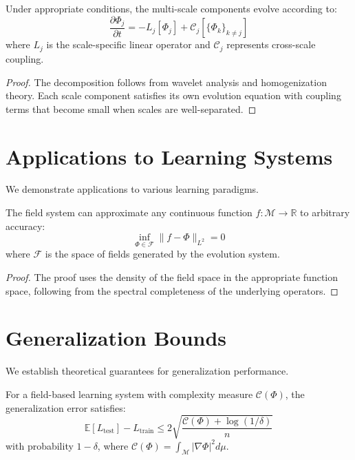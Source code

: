 \begin{theorem}
\label{thm:scale_separation}
Under appropriate conditions, the multi-scale components evolve according to:
$$\frac{\partial \Phi_j}{\partial t} = -L_j[\Phi_j] + \mathcal{C}_j[\{\Phi_k\}_{k \neq j}]$$
where $L_j$ is the scale-specific linear operator and $\mathcal{C}_j$ represents cross-scale coupling.
\end{theorem}

\begin{proof}
The decomposition follows from wavelet analysis and homogenization theory. Each scale component satisfies its own evolution equation with coupling terms that become small when scales are well-separated.
\end{proof}

\section{Applications to Learning Systems}

We demonstrate applications to various learning paradigms.

\begin{theorem}
\label{thm:universal_approximation}
The field system can approximate any continuous function $f: \mathcal{M} \to \mathbb{R}$ to arbitrary accuracy:
$$\inf_{\Phi \in \mathcal{F}} \|f - \Phi\|_{L^2} = 0$$
where $\mathcal{F}$ is the space of fields generated by the evolution system.
\end{theorem}

\begin{proof}
The proof uses the density of the field space in the appropriate function space, following from the spectral completeness of the underlying operators.
\end{proof}

\section{Generalization Bounds}

We establish theoretical guarantees for generalization performance.

\begin{theorem}
\label{thm:field_generalization}
For a field-based learning system with complexity measure $\mathcal{C}(\Phi)$, the generalization error satisfies:
$$\mathbb{E}[L_{\text{test}}] - L_{\text{train}} \leq 2\sqrt{\frac{\mathcal{C}(\Phi) + \log(1/\delta)}{n}}$$
with probability $1-\delta$, where $\mathcal{C}(\Phi) = \int_{\mathcal{M}} |\nabla \Phi|^2 d\mu$.
\end{theorem}

